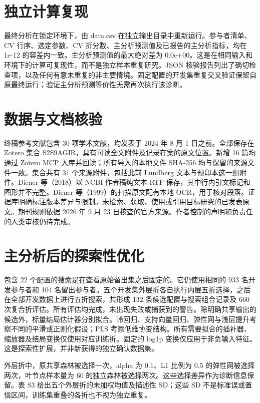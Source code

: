 \documentclass[11pt,letterpaper]{article}
\begin{document}
\endgroup

\section{独立计算复现}\label{ux72ecux7acbux8ba1ux7b97ux590dux73b0}

最终分析在锁定环境下，由 data.csv 在独立输出目录中重新运行。参与者清单、CV 行序、选定参数、CV 折分数、主分析预测值及已报告的主分析指标，均在 1e-12 的容差内一致。主分析预测值的最大绝对差为 0.0e+00。这是在相同输入和环境下的计算可复现性，而不是独立样本重复研究。JSON 核验报告列出了确切检查项，以及任何有意未重复的非主要情境。固定配置的开发集重复交叉验证保留自原最终运行；验证主分析预测等价性无需再次执行该诊断。

\section{数据与文档核验}\label{ux6570ux636eux4e0eux6587ux6863ux6838ux9a8c}

终稿参考文献包含 30 项学术文献，均发表于 2024 年 8 月 1 日之前。全部保存在 Zotero 集合 S2S9AGIR，具有可读全文附件及记录在案的原文位置。新增 16 篇均通过 Zotero MCP 入库并回读；所有导入的本地文件 SHA-256 均与保留的来源文件一致。集合共有 31 个来源附件，包括此前 Lundberg 文本与预印本这一组附件。Diener 等（2018）以 NCBI 作者稿纯文本 RTF 保存，其中行内引文标记和图形并不完整。Diener 等（1999）的扫描原文配有本地 OCR，用于核对段落。证据库明确标注版本差异与限制。未检索、获取、使用或引用目标研究的已发表原文。期刊规则依据 2026 年 9 月 23 日核查的官方来源。作者控制的声明和负责任的人类审核仍待完成。

\section{主分析后的探索性优化}\label{ux4e3bux5206ux6790ux540eux7684ux63a2ux7d22ux6027ux4f18ux5316}

包含 22 个配置的搜索是在查看原始留出集之后固定的。它仍使用相同的 933 名开发参与者和 104 名留出参与者。五个开发集外层折各自执行内层五折选择，之后在全部开发数据上进行五折搜索，共形成 132 条候选配置与搜索组合记录及 660 次复合折评估。所有评估均完成，未出现失败或捕获到的警告。除明确共享输出的候选外，标量结局估计器分别拟合。岭回归、支持向量回归、弹性网与浅层提升考察不同的平滑或正则化假设；PLS 考察低维协变结构。所有需要拟合的插补器、缩放器及结局变换仅使用对应训练折。固定的 log1p 变换仅应用于非负输入特征。这是探索性扩展，并非新获得的独立确认数据集。

外层折中，原共享森林被选择一次，alpha 为 0.1、L1 比例为 0.5 的弹性网被选择两次，叶节点样本量为 60 的独立森林被选择两次。这些选择差异作为诊断信息保留。表 S3 给出五个外层折的未加权均值及描述性 SD；这些 SD 不是标准误或置信区间，训练集重叠的各折也不视为独立重复。
\end{document}
